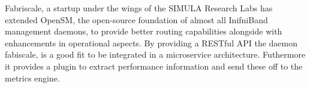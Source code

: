 Fabriscale, a startup under the wings of the SIMULA Research Labs has extended OpenSM, the open-source foundation of
almost all InifniBand management daemons, to provide better routing capabilities alongside with enhancements in operational aspects.
By providing a RESTful API the daemon fabiscale, is a good fit to be integrated in a microservice architecture. Futhermore it
provides a plugin to extract performance information and send these off to the metrics engine.
